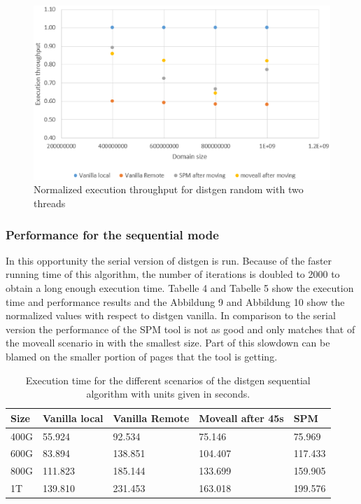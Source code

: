 \begin{figure}[th]
	\centering
		\includegraphics[width=.8\textwidth]{figures/thrput-dgentt-randm.eps}
		\caption{Normalized execution throughput for distgen random with two threads}
		\label{fig:thrput-dgentt-randm}
\end{figure}

\subsubsection{Performance for the sequential mode}\label{subsection:res-dgseq-2t}
In this opportunity the serial version of distgen is run. Because of the faster running time of this algorithm, the number of iterations is doubled to 2000 to obtain a long enough execution time.  Tabelle 4 and Tabelle 5 show the execution time and performance results and the Abbildung 9 and Abbildung 10 show the normalized values with respect to distgen vanilla. In comparison to the serial version the performance of the SPM tool is not as good and only matches that of the moveall scenario in with the smallest size. Part of this slowdown can be blamed on the smaller portion of pages that the tool is getting.

\begin{table}[th]
	\centering
		\begin{tabularx}{\textwidth}{|l|l|l|l|X|}
		\hline
			Size & Vanilla local & Vanilla Remote & Moveall after 45s & SPM \\
			\hline
			400G & 55.924 & 92.534 & 75.146 & 75.969\\
			\hline
			600G & 83.894 & 138.851 & 104.407 & 117.433\\
			\hline
			800G & 111.823 & 185.144 & 133.699 & 159.905\\
			\hline
			1T & 139.810 & 231.453 & 163.018 & 199.576\\
			\hline
		\end{tabularx}
		\caption{Execution time for the different scenarios of the distgen sequential algorithm with units given in seconds.}
		\label{table:table:res-tbl-dgenmvdseq2t}
\end{table}

